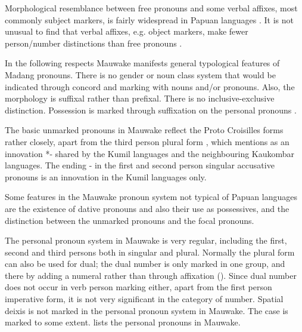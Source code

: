 Morphological resemblance between free pronouns and some verbal affixes, most commonly subject markers, is fairly widespread in Papuan languages \citep{Franklin1979}. It is not unusual to find that verbal affixes, e.g. object markers, make fewer person/number distinctions than free pronouns \citep[67]{Foley1986}.

In the following respects Mauwake manifests general typological features of  Madang pronouns. There is no gender or noun class system that would be indicated through concord and marking with nouns and/or pronouns. Also, the morphology is suffixal rather than prefixal. There is no inclusive-exclusive distinction. Possession is marked through suffixation on the personal pronouns \citep[40--42]{Wurm1982}. 

The basic unmarked pronouns in Mauwake reflect the Proto Croisilles forms rather closely, apart from the third person plural form , which \citet[23]{Ross1996} mentions as an innovation *- shared by the Kumil languages and the neighbouring Kaukombar languages. The ending - in the first and second person singular accusative pronouns is an innovation in the Kumil languages only. 

Some features in the Mauwake pronoun system not typical of Papuan languages are the existence of dative pronouns and also their use as possessives, and the distinction between the unmarked pronouns and the focal pronouns. 

\newpage
The personal pronoun system in Mauwake is very regular, including the first, second and third persons both in singular and plural. Normally the plural form can also be used for dual; the dual number is only marked in one group, and there by adding a numeral rather than through affixation (). Since dual number does not occur in verb person marking either, apart from the first person imperative form, it is not very significant in the category of number. Spatial deixis is not marked in the personal pronoun system in Mauwake. The case is marked to some extent.  lists the personal pronouns in Mauwake.

